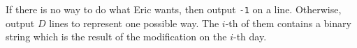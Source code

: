 If there is no way to do what Eric wants, then output \verb+-1+ on a line.
Otherwise, output $D$ lines to represent one possible way. 
The $i$-th of them contains a binary string which is the result of the modification on 
the $i$-th day.
